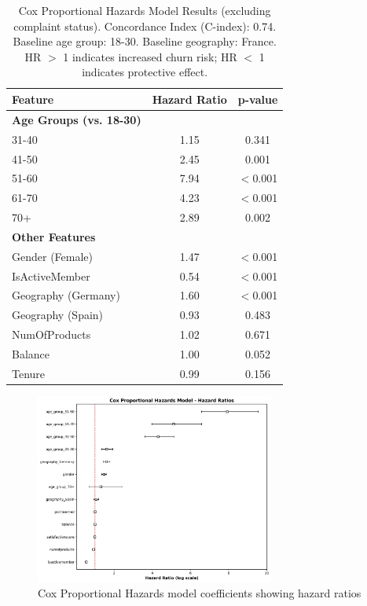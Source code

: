 \documentclass[12pt]{article}
\begin{document}
\begin{table}[H]
\centering
\caption{Cox Proportional Hazards Model Results (excluding complaint status). Concordance Index (C-index): 0.74. Baseline age group: 18-30. Baseline geography: France. HR $>$ 1 indicates increased churn risk; HR $<$ 1 indicates protective effect.}
\label{tab:cox_results}
\begin{tabular}{lcc}
\toprule
\textbf{Feature} & \textbf{Hazard Ratio} & \textbf{p-value} \\
\midrule
\textbf{Age Groups (vs. 18-30)} & & \\
\phantom{---} 31-40 & 1.15 & 0.341 \\
\phantom{---} 41-50 & 2.45 & 0.001 \\
\phantom{---} 51-60 & 7.94 & $<$0.001 \\
\phantom{---} 61-70 & 4.23 & $<$0.001 \\
\phantom{---} 70+ & 2.89 & 0.002 \\
\midrule
\textbf{Other Features} & & \\
\phantom{---} Gender (Female) & 1.47 & $<$0.001 \\
\phantom{---} IsActiveMember & 0.54 & $<$0.001 \\
\phantom{---} Geography (Germany) & 1.60 & $<$0.001 \\
\phantom{---} Geography (Spain) & 0.93 & 0.483 \\
\phantom{---} NumOfProducts & 1.02 & 0.671 \\
\phantom{---} Balance & 1.00 & 0.052 \\
\phantom{---} Tenure & 0.99 & 0.156 \\
\bottomrule
\end{tabular}
\end{table}

\begin{figure}[H]
\centering
\includegraphics[width=0.7\textwidth]{img/14_cox_ph_coefficients.png}
\caption{Cox Proportional Hazards model coefficients showing hazard ratios}
\label{fig:cox_coefficients}
\end{figure}
\end{document}
